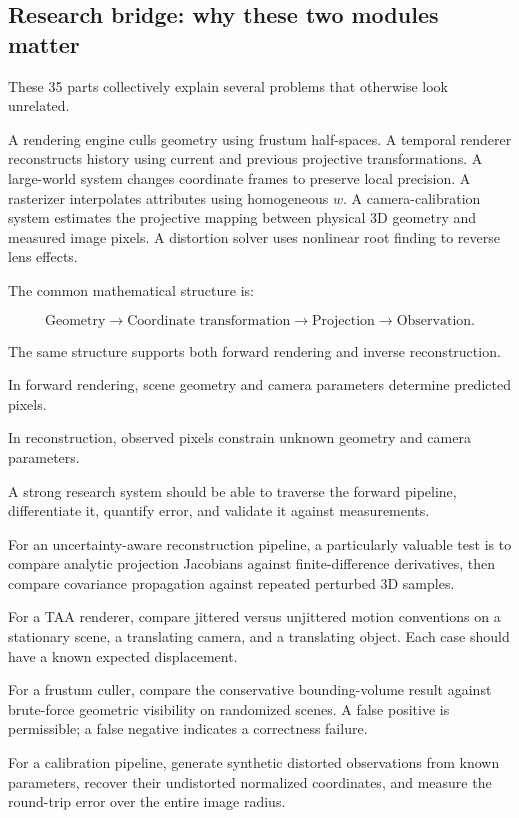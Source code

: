 \subsection{Research bridge: why these two modules matter}\label{02-foundations-ii-ch037-research-bridge-why-these-two-modules-matter}

These 35 parts collectively explain several problems that otherwise look unrelated.

A rendering engine culls geometry using frustum half-spaces. A temporal renderer reconstructs history using current and previous projective transformations. A large-world system changes coordinate frames to preserve local precision. A rasterizer interpolates attributes using homogeneous \(w\). A camera-calibration system estimates the projective mapping between physical 3D geometry and measured image pixels. A distortion solver uses nonlinear root finding to reverse lens effects.

The common mathematical structure is:

\[
 \boxed{ \text{Geometry} \rightarrow \text{Coordinate transformation} \rightarrow \text{Projection} \rightarrow \text{Observation} }.
\]

The same structure supports both forward rendering and inverse reconstruction.

In forward rendering, scene geometry and camera parameters determine predicted pixels.

In reconstruction, observed pixels constrain unknown geometry and camera parameters.

A strong research system should be able to traverse the forward pipeline, differentiate it, quantify error, and validate it against measurements.

For an uncertainty-aware reconstruction pipeline, a particularly valuable test is to compare analytic projection Jacobians against finite-difference derivatives, then compare covariance propagation against repeated perturbed 3D samples.

For a TAA renderer, compare jittered versus unjittered motion conventions on a stationary scene, a translating camera, and a translating object. Each case should have a known expected displacement.

For a frustum culler, compare the conservative bounding-volume result against brute-force geometric visibility on randomized scenes. A false positive is permissible; a false negative indicates a correctness failure.

For a calibration pipeline, generate synthetic distorted observations from known parameters, recover their undistorted normalized coordinates, and measure the round-trip error over the entire image radius.


